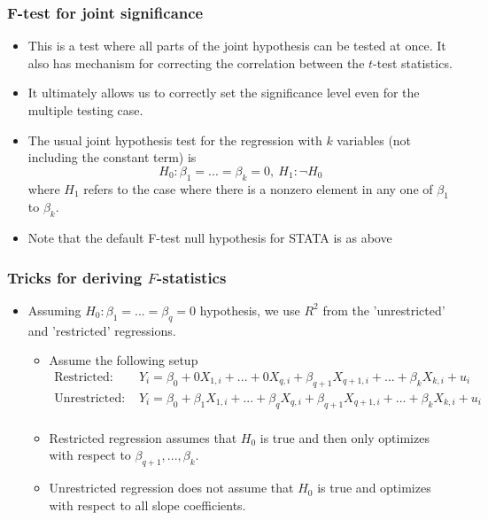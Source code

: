 \documentclass[aspectratio=169]{beamer}
\begin{document}
\begin{frame}
\frametitle{F-test for joint significance}
\begin{itemize}
\item This is a test where all parts of the joint hypothesis can be tested at once. It also has mechanism for correcting the correlation between the $t$-test statistics.
\item It ultimately allows us to correctly set the significance level even for the multiple testing case.
\item The usual joint hypothesis test for the regression with $k$ variables (not including the constant term) is
\[
H_0: \beta_1 = ... =\beta_k=0, \ H_1:\lnot H_0
\]
where $H_1$ refers to the case where there is a nonzero element in any one of $\beta_1$ to $\beta_k$.
\item Note that the default F-test null hypothesis for STATA is as above
\end{itemize}
\end{frame}



\begin{frame}
\frametitle{Tricks for deriving $F$-statistics}
\begin{itemize}
\item Assuming $H_0: \beta_1 = ... =\beta_q=0$ hypothesis, we use $R^2$ from the 'unrestricted' and 'restricted' regressions.
\begin{itemize}
\item Assume the following setup
\footnotesize{\[\begin{aligned}
\text{Restricted: } & Y_i =\beta_0+ 0X_{1,i} + ...+ 0X_{q,i}+ \beta_{q+1}X_{q+1,i}+...+\beta_kX_{k,i} + u_i\\
\text{Unrestricted: } & Y_i = \beta_0+\beta_1X_{1,i} + ... +\beta_qX_{q,i}+ \beta_{q+1}X_{q+1,i}+...+\beta_kX_{k,i} + u_i\\
\end{aligned}\]}\normalsize
\item Restricted regression assumes that $H_0$ is true and then only optimizes with respect to $\beta_{q+1},...,\beta_{k}$.
\item Unrestricted regression does not assume that $H_0$ is true and optimizes with respect to all slope coefficients.
\end{itemize}
\end{itemize}
\end{frame}
\end{document}
